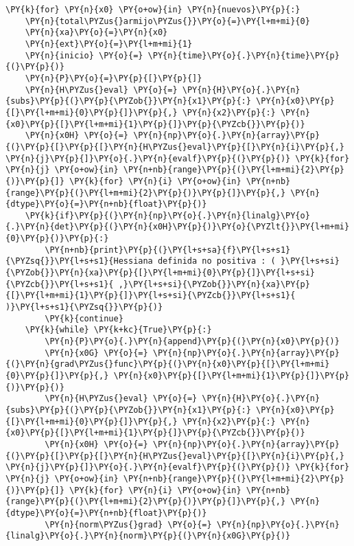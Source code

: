 \begin{itemize}
\begin{tcolorbox}[breakable, size=fbox, boxrule=1pt, pad at break*=1mm,colback=cellbackground, colframe=cellborder]
\begin{Verbatim}[commandchars=\\\{\}]
\PY{k}{for} \PY{n}{x0} \PY{o+ow}{in} \PY{n}{nuevos}\PY{p}{:} 
    \PY{n}{total\PYZus{}armijo\PYZus{}}\PY{o}{=}\PY{l+m+mi}{0}
    \PY{n}{xa}\PY{o}{=}\PY{n}{x0}
    \PY{n}{ext}\PY{o}{=}\PY{l+m+mi}{1}
    \PY{n}{inicio} \PY{o}{=} \PY{n}{time}\PY{o}{.}\PY{n}{time}\PY{p}{(}\PY{p}{)}
    \PY{n}{P}\PY{o}{=}\PY{p}{[}\PY{p}{]}
    \PY{n}{H\PYZus{}eval} \PY{o}{=} \PY{n}{H}\PY{o}{.}\PY{n}{subs}\PY{p}{(}\PY{p}{\PYZob{}}\PY{n}{x1}\PY{p}{:} \PY{n}{x0}\PY{p}{[}\PY{l+m+mi}{0}\PY{p}{]}\PY{p}{,} \PY{n}{x2}\PY{p}{:} \PY{n}{x0}\PY{p}{[}\PY{l+m+mi}{1}\PY{p}{]}\PY{p}{\PYZcb{}}\PY{p}{)}
    \PY{n}{x0H} \PY{o}{=} \PY{n}{np}\PY{o}{.}\PY{n}{array}\PY{p}{(}\PY{p}{[}\PY{p}{[}\PY{n}{H\PYZus{}eval}\PY{p}{[}\PY{n}{i}\PY{p}{,} \PY{n}{j}\PY{p}{]}\PY{o}{.}\PY{n}{evalf}\PY{p}{(}\PY{p}{)} \PY{k}{for} \PY{n}{j} \PY{o+ow}{in} \PY{n+nb}{range}\PY{p}{(}\PY{l+m+mi}{2}\PY{p}{)}\PY{p}{]} \PY{k}{for} \PY{n}{i} \PY{o+ow}{in} \PY{n+nb}{range}\PY{p}{(}\PY{l+m+mi}{2}\PY{p}{)}\PY{p}{]}\PY{p}{,} \PY{n}{dtype}\PY{o}{=}\PY{n+nb}{float}\PY{p}{)}
    \PY{k}{if}\PY{p}{(}\PY{n}{np}\PY{o}{.}\PY{n}{linalg}\PY{o}{.}\PY{n}{det}\PY{p}{(}\PY{n}{x0H}\PY{p}{)}\PY{o}{\PYZlt{}}\PY{l+m+mi}{0}\PY{p}{)}\PY{p}{:}
        \PY{n+nb}{print}\PY{p}{(}\PY{l+s+sa}{f}\PY{l+s+s1}{\PYZsq{}}\PY{l+s+s1}{Hessiana definida no positiva : ( }\PY{l+s+si}{\PYZob{}}\PY{n}{xa}\PY{p}{[}\PY{l+m+mi}{0}\PY{p}{]}\PY{l+s+si}{\PYZcb{}}\PY{l+s+s1}{ ,}\PY{l+s+si}{\PYZob{}}\PY{n}{xa}\PY{p}{[}\PY{l+m+mi}{1}\PY{p}{]}\PY{l+s+si}{\PYZcb{}}\PY{l+s+s1}{ )}\PY{l+s+s1}{\PYZsq{}}\PY{p}{)}
        \PY{k}{continue}
    \PY{k}{while} \PY{k+kc}{True}\PY{p}{:}
        \PY{n}{P}\PY{o}{.}\PY{n}{append}\PY{p}{(}\PY{n}{x0}\PY{p}{)}
        \PY{n}{x0G} \PY{o}{=} \PY{n}{np}\PY{o}{.}\PY{n}{array}\PY{p}{(}\PY{n}{grad\PYZus{}func}\PY{p}{(}\PY{n}{x0}\PY{p}{[}\PY{l+m+mi}{0}\PY{p}{]}\PY{p}{,} \PY{n}{x0}\PY{p}{[}\PY{l+m+mi}{1}\PY{p}{]}\PY{p}{)}\PY{p}{)}
        \PY{n}{H\PYZus{}eval} \PY{o}{=} \PY{n}{H}\PY{o}{.}\PY{n}{subs}\PY{p}{(}\PY{p}{\PYZob{}}\PY{n}{x1}\PY{p}{:} \PY{n}{x0}\PY{p}{[}\PY{l+m+mi}{0}\PY{p}{]}\PY{p}{,} \PY{n}{x2}\PY{p}{:} \PY{n}{x0}\PY{p}{[}\PY{l+m+mi}{1}\PY{p}{]}\PY{p}{\PYZcb{}}\PY{p}{)}
        \PY{n}{x0H} \PY{o}{=} \PY{n}{np}\PY{o}{.}\PY{n}{array}\PY{p}{(}\PY{p}{[}\PY{p}{[}\PY{n}{H\PYZus{}eval}\PY{p}{[}\PY{n}{i}\PY{p}{,} \PY{n}{j}\PY{p}{]}\PY{o}{.}\PY{n}{evalf}\PY{p}{(}\PY{p}{)} \PY{k}{for} \PY{n}{j} \PY{o+ow}{in} \PY{n+nb}{range}\PY{p}{(}\PY{l+m+mi}{2}\PY{p}{)}\PY{p}{]} \PY{k}{for} \PY{n}{i} \PY{o+ow}{in} \PY{n+nb}{range}\PY{p}{(}\PY{l+m+mi}{2}\PY{p}{)}\PY{p}{]}\PY{p}{,} \PY{n}{dtype}\PY{o}{=}\PY{n+nb}{float}\PY{p}{)}
        \PY{n}{norm\PYZus{}grad} \PY{o}{=} \PY{n}{np}\PY{o}{.}\PY{n}{linalg}\PY{o}{.}\PY{n}{norm}\PY{p}{(}\PY{n}{x0G}\PY{p}{)}    

\end{Verbatim}
\end{tcolorbox}
\end{itemize}

